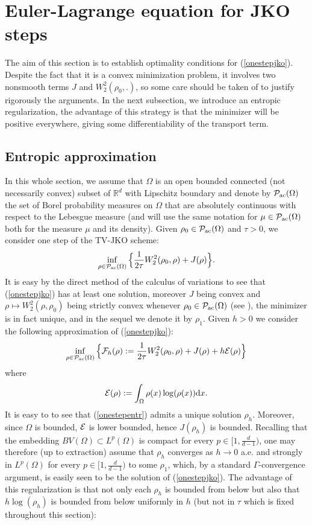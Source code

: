 \documentclass[12pt, a4paper]{article}
\numberwithin{equation}{section}
\theoremstyle{plain}
\theoremstyle{definition}
\theoremstyle{remark}
\newcommand\F{{\cal F}}
\newcommand\EE{{\cal E}}
\newcommand\PPa{{\cal P}_{\rm{ac}}(\Omega)}
\newcommand{\R}{\mathbb{R}}
\newcommand\pref[1]{(\ref{#1})}
\begin{document}
 
\section{Euler-Lagrange equation for JKO steps }\label{sec-opti} 
 
 
 The aim of this section is to establish optimality conditions for \pref{onestepjko}. Despite the fact that it is a convex minimization problem, it involves two nonsmooth terms $J$ and $W^2_2(\rho_0,.)$, so some care should be taken of to justify rigorously the arguments. In the next subsection, we introduce an entropic regularization, the advantage of this strategy is that the minimizer will be positive everywhere, giving some differentiability of the transport term.  
 
 \subsection{Entropic approximation}\label{subsec-entreg}
 
 In this whole section, we assume that $\Omega$ is an open bounded connected (not necessarily convex) subset of $\R^d$ with  Lipschitz boundary and denote by $\PPa$ the set of Borel probability measures on $\Omega$ that are absolutely continuous with respect to the Lebesgue measure (and will use the same notation for $\mu\in \PPa$ both for the measure $\mu$ and its density). Given $\rho_0 \in \PPa$ and $\tau>0$, we consider one step of the TV-JKO scheme:
\begin{equation}\label{onestepjko}
\inf_{\rho \in \PPa}  \Big\{ \frac{1}{2\tau} W_2^2(\rho_0, \rho)+ J(\rho) \Big\}.
\end{equation}
It is easy by the direct method of the calculus of variations to see that \pref{onestepjko} has at least one solution, moreover $J$ being convex and $\rho \mapsto W_2^2(\rho, \rho_{0})$ being strictly convex whenever $\rho_0 \in \PPa$ (see \cite{santambrogio2015optimal}), the minimizer is in fact unique, and in the sequel we denote it by  $\rho_1$.  Given $h>0$ we consider the following approximation of \pref{onestepjko}:
 \begin{equation}\label{onestepentr}
 \inf_{\rho\in \PPa} \Big\{   \F_h(\rho):= \frac{1}{2\tau} W_2^2(\rho_0, \rho)+J(\rho)+h \EE(\rho) \Big\} 
 \end{equation}
 where
 \[\EE(\rho):=\int_{\Omega} \rho(x) \log(\rho(x)) \mbox{d}x.\]
It is easy to  to see that \pref{onestepentr} admits a unique solution $\rho_h$. Moreover, since $\Omega$ is bounded, $\EE$ is lower bounded, hence  $J(\rho_h)$ is bounded. Recalling  that the embedding $BV(\Omega)\subset L^p(\Omega)$ is compact for every  $p\in[1, \frac{d}{d-1})$, one may therefore (up to extraction) assume that $\rho_h$ converges as $h\to 0$ a.e. and strongly in $L^p(\Omega)$ for every $p\in[1, \frac{d}{d-1})$ to some $\rho_1$, which, by a standard $\Gamma$-convergence argument, is easily seen to be the solution of \pref{onestepjko}. The advantage of this regularization is that not only each $\rho_h$ is bounded from below but also that $h \log(\rho_h)$ is bounded from below uniformly in $h$ (but not in $\tau$ which is fixed throughout this section):
\end{document}
